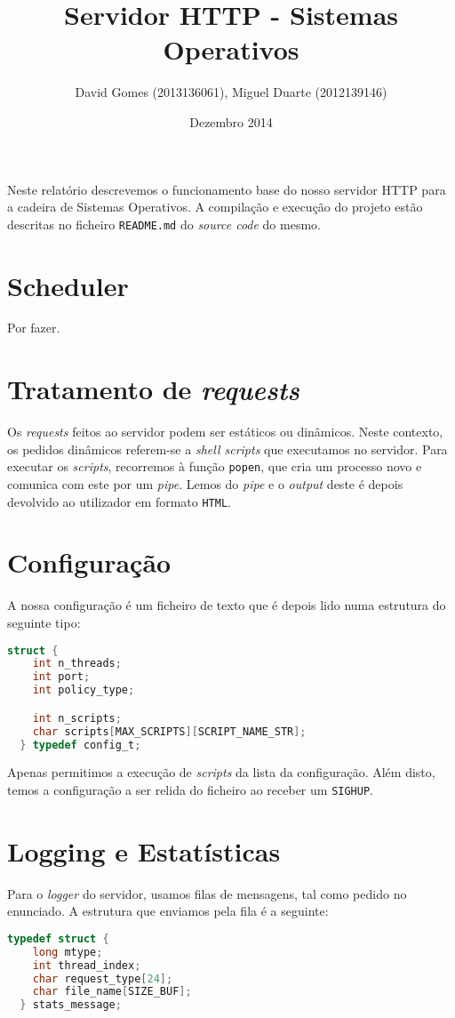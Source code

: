 \documentclass[12pt]{article}
\title{Servidor HTTP - Sistemas Operativos}
\author{David Gomes (2013136061), Miguel Duarte (2012139146)}
\date{Dezembro 2014}
\begin{document}
\maketitle

Neste relatório descrevemos o funcionamento base do nosso servidor HTTP
para a cadeira de Sistemas Operativos. A compilação e execução do projeto
estão descritas no ficheiro \texttt{README.md} do \textit{source code} do
mesmo.

\section{Scheduler}
Por fazer.

\section{Tratamento de \textit{requests}}
Os \textit{requests} feitos ao servidor podem ser estáticos ou dinâmicos. Neste
contexto, os pedidos dinâmicos referem-se a \textit{shell scripts} que executamos
no servidor. Para executar os \textit{scripts}, recorremos à função
\texttt{popen}, que cria um processo novo e comunica com este por um \textit{pipe}.
Lemos do \textit{pipe} e o \textit{output} deste é depois devolvido ao utilizador
em formato \texttt{HTML}.

\section{Configuração}
A nossa configuração é um ficheiro de texto que é depois lido numa estrutura
do seguinte tipo:

\vspace{2mm}
\begin{lstlisting}[language=C]
  struct {
    int n_threads;
    int port;
    int policy_type;

    int n_scripts;
    char scripts[MAX_SCRIPTS][SCRIPT_NAME_STR];
  } typedef config_t;
\end{lstlisting}

Apenas permitimos a execução de \textit{scripts} da lista da configuração. Além disto,
temos a configuração a ser relida do ficheiro ao receber um \texttt{SIGHUP}.

\section{Logging e Estatísticas}
Para o \textit{logger} do servidor, usamos filas de mensagens, tal como pedido
no enunciado. A estrutura que enviamos pela fila é a seguinte:

\vspace{2mm}
\begin{lstlisting}[language=C]
  typedef struct {
    long mtype;
    int thread_index;
    char request_type[24];
    char file_name[SIZE_BUF];
  } stats_message;
\end{lstlisting}
\end{document}
